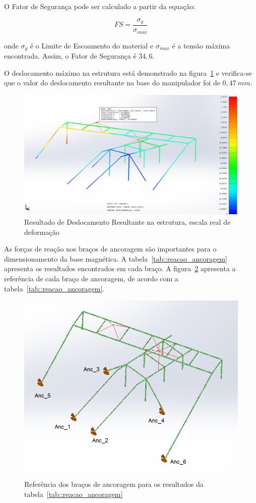 O Fator de Segurança pode ser calculado a partir da equação: 

\begin{equation*}
	FS=\frac{\sigma _y}{\sigma _{max}}
\end{equation*}

onde $\sigma_y$ é o Limite de Escoamento do material e $\sigma_{max}$ é a tensão
máxima encontrada. Assim, o Fator de Segurança é $34,6$.

O deslocamento máximo na estrutura está demonstrado na
figura~\ref{fig::deslocamento} e verifica-se que o valor do deslocamento
resultante na base do manipulador foi de $0,47~mm$.

\begin{figure}[H]
	\centering
	\includegraphics[width=0.9\columnwidth]{figs/dimensionamento/deslocamento}
	\caption{Resultado de Deslocamento Resultante na estrutura, escala real de
	deformação}
    \label{fig::deslocamento}
\end{figure}


As forças de reação nos braços de ancoragem são importantes para o
dimensionamento da base magnética. A tabela~\ref{tab::reacao_ancoragem}
apresenta os resultados encontrados em cada braço. A
figura~\ref{fig::mapa_forcas} apresenta a referência de cada braço de
ancoragem, de acordo com a tabela~\ref{tab::reacao_ancoragem}.

\begin{figure}[h!]
	\centering
	\includegraphics[width=0.8\columnwidth]{figs/dimensionamento/mapa_forcas}
	\caption{Referência dos braços de ancoragem para os resultados da
	tabela~\ref{tab::reacao_ancoragem}}
    \label{fig::mapa_forcas}
\end{figure}

